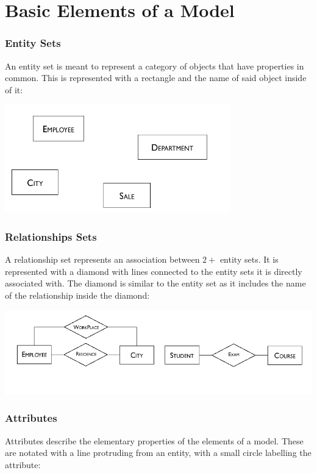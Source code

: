 \documentclass{report}
\begin{document}
\section{Basic Elements of a Model}
\subsubsection{Entity Sets}

\hspace{.5cm} An entity set is meant to represent a category of objects that have properties in common. This is represented with a rectangle and the name of said object inside of it:

\includegraphics{2022-12-13-19-59-13.png}


\subsubsection{Relationships Sets}

\hspace{.5cm} A relationship set represents an association between $2+$ entity sets. It is represented with a diamond with lines connected to the entity sets it is directly associated with. The diamond is similar to the entity set as it includes the name of the relationship inside the diamond:

\includegraphics[scale=.7]{2022-12-13-20-09-52.png}

\subsubsection{Attributes}

\hspace{.5cm} Attributes describe the elementary properties of the elements of a model. These are notated with a line protruding from an entity, with a small circle labelling the attribute:
\end{document}
